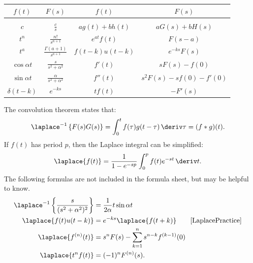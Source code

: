 \documentclass[10pt, a4paper]{article}
\begin{document}
\begin{landscape}
\begin{multicols}{2}
    {
    \everymath{\displaystyle}
    \begin{center}
    \begin{tabular}{cc@{\hskip 1cm}cc}
        \toprule
        \(f(t)\) & \(F(s)\) & \(f(t)\) & \(F(s)\) \\
        \midrule \\[-10pt]
        \(c\) & \(\frac{c}{s}\) & \(a g(t) + b h(t)\) & \(a G(s) + b H(s)\) \\[10pt]
        \(t^{n}\) & \(\frac{n!}{s^{n+1}}\) & \(e^{at} f(t)\) & \(F(s-a)\) \\[10pt]
        \(t^{a}\) & \(\frac{\Gamma(a+1)}{s^{a+1}}\) & \(f(t-k)u(t-k)\) & \(e^{-ks} F(s)\) \\[10pt]
        \(\cos \alpha t\) & \(\frac{s}{s^{2} + \alpha^{2}}\) & \(f'(t)\) & \(s F(s) - f(0)\) \\[10pt]
        \(\sin \alpha t\) & \(\frac{\alpha}{s^{2} + \alpha^{2}}\) & \(f''(t)\) & \(s^{2} F(s) - sf(0) - f'(0)\) \\[10pt]
        \(\delta(t - k)\) & \(e^{-ks}\) & \(t f(t)\) & \(-F'(s)\) \\[1pt]
        \bottomrule
    \end{tabular}
    \end{center}
    }

    The convolution theorem states that:
    \[
        \laplace^{-1} \left\{F(s) G(s)\right\}
        = \int_0^t f(\tau) g(t - \tau) \,\deriv \tau
        = (f * g)(t).
    \]
    If \(f(t)\) has period \(p\), then the Laplace integral can be simplified:
    \[
        \laplace\{f(t)\}
        = \frac{1}{1 - e^{-sp}} \int_0^p f(t) e^{-st} \,\deriv t.
    \]
    The following formulas are not included in the formula sheet, but may be helpful to know.
    \begin{align*}
        \laplace^{-1} \left\{\frac{s}{(s^2 + \alpha^2)^2}\right\} &= \frac{1}{2\alpha} t \sin \alpha t \\
        \laplace \{f(t) u(t-k)\} &= e^{-ks} \laplace\{f(t+k)\} \tag*{\cite{LaplacePractice}} \\
        \laplace \{f^{(n)}(t)\} &= s^n F(s) - \sum_{k=1}^n s^{n-k} f^{(k-1)}(0) \\
        \laplace \{t^n f(t)\} &= (-1)^n F^{(n)}(s).
    \end{align*}

\end{multicols}


\pagebreak


\end{landscape}
\end{document}
